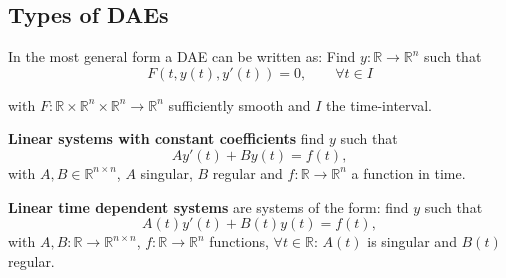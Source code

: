	\subsection{Types of DAEs}
	\begin{frame}
		In the most general form a DAE can be written as:
		Find $y:\mathbb{R} \to \mathbb{R}^n$ such that
		\begin{equation}
			\label{Abstract_DAE}
			F(t, y(t), y'(t)) = 0, \qquad \forall t \in I
		\end{equation}
		
		with $F:\mathbb{R} \times \mathbb{R}^n \times \mathbb{R}^n \to \mathbb{R}^n$ sufficiently smooth and $I$ the time-interval.
		
		\textbf{Linear systems with constant coefficients} \newline
		find $y$ such that
		\begin{equation}
			\label{DAE-const-coeff}
			A y'(t) + B y(t) = f(t) ,
		\end{equation}
		with $A,B \in \mathbb{R}^{n \times n}$, $A$ singular, $B$ regular and $f:\mathbb{R} \to \mathbb{R}^n$ a function in time.
		
		\textbf{Linear time dependent systems}
		are systems of the form: find $y$ such that
		\begin{displaymath}
			A(t) y'(t) + B(t) y(t) = f(t) ,
		\end{displaymath}
		with $A, B:\mathbb{R} \to \mathbb{R}^{n \times n}$, $f:\mathbb{R} \to \mathbb{R}^n$ functions, $\forall t \in \mathbb{R}$: $A(t)$ is singular and $B(t)$ regular.
	\end{frame}
	
